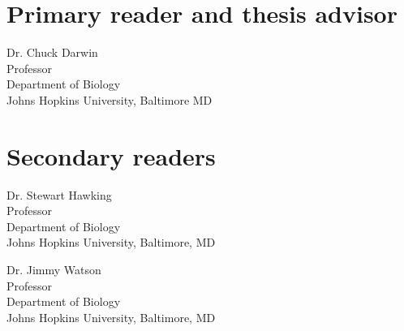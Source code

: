 

\Blindtext[3]



\begin{singlespace}

    \section*{Primary reader and thesis advisor}
    
    Dr. Chuck Darwin \\
    Professor\\
    Department of Biology\\
    Johns Hopkins University, Baltimore MD 


    \section*{Secondary readers}
    
    Dr. Stewart Hawking\\
    Professor\\
    Department of Biology \\
    Johns Hopkins University, Baltimore, MD 
    
    \vspace{0.1in}
    
    Dr. Jimmy Watson \\
    Professor\\
    Department of Biology \\
    Johns Hopkins University, Baltimore, MD 



\end{singlespace}